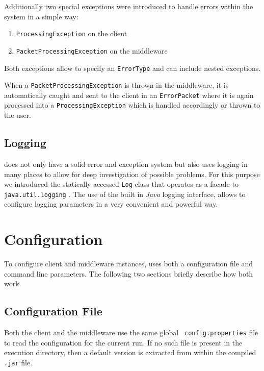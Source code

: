 \documentclass[a4paper, oneside]{csthesis}
\begin{document}
\begin{table}[ht]
\begin{adjustbox}{center}
        \end{adjustbox}
        \caption{Error codes in the system. Specified in the class {\tt
        ErrorType}.}
        \label{tbl:error-codes}
    \end{table}
    
    Additionally two special exceptions were introduced to handle errors within
    the system in a simple way:
    \begin{enumerate}
        \item {\tt ProcessingException} on the client
        \item {\tt PacketProcessingException} on the middleware
    \end{enumerate}
    Both exceptions allow to specify an {\tt ErrorType} and can include nested
    exceptions.
    
    When a {\tt PacketProcessingException} is thrown in the middleware, it is
    automatically caught and sent to the client in an {\tt ErrorPacket} where it
    is again processed into a {\tt ProcessingException} which is handled
    accordingly or thrown to the user.
    
\subsection{Logging}
    \telesto{} does not only have a solid error and exception system but also
    uses logging in many places to allow for deep investigation of possible
    problems. For this purpose we introduced the statically accessed {\tt Log}
    class that operates as a facade to {\tt java.util.logging}
    . The use of
    the built in {\it Java} logging interface, allows to configure logging
    parameters in a very convenient and powerful way.

\section{Configuration}
    To configure client and middleware instances, \telesto{} uses both a
    configuration file and command line parameters. The following two sections
    briefly describe how both work.
    
\subsection{Configuration File}
    Both the client and the middleware use the same global {\tt
    config.properties} file to read the configuration for the current run. If no
    such file is present in the execution directory, then a default version is
    extracted from within the compiled {\tt .jar} file.
    
\end{document}
